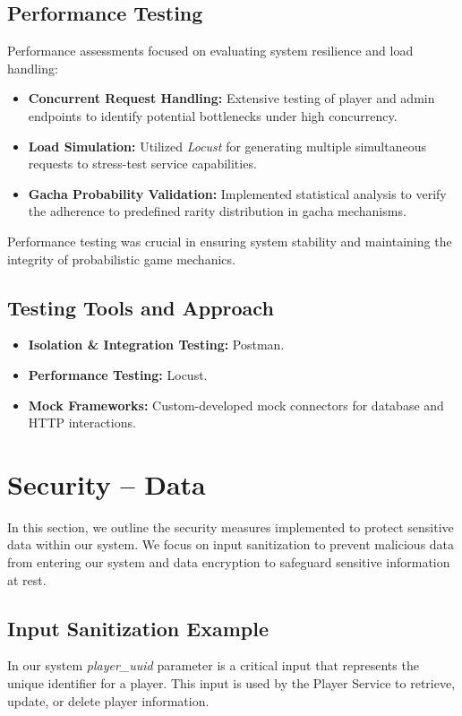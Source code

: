 \documentclass{article}
\begin{document}
\subsection{Performance Testing}
Performance assessments focused on evaluating system resilience and load handling:
\begin{itemize}
    \item \textbf{Concurrent Request Handling:} Extensive testing of player and admin endpoints to identify potential bottlenecks under high concurrency.
    \item \textbf{Load Simulation:} Utilized \emph{Locust} for generating multiple simultaneous requests to stress-test service capabilities.
    \item \textbf{Gacha Probability Validation:} Implemented statistical analysis to verify the adherence to predefined rarity distribution in gacha mechanisms.
\end{itemize}
Performance testing was crucial in ensuring system stability and maintaining the integrity of probabilistic game mechanics.

\subsection{Testing Tools and Approach}
\begin{itemize}
    \item \textbf{Isolation \& Integration Testing:} Postman.
    \item \textbf{Performance Testing:} Locust.
    \item \textbf{Mock Frameworks:} Custom-developed mock connectors for database and HTTP interactions.
\end{itemize}
\newpage

\section{Security – Data}
In this section, we outline the security measures implemented to protect sensitive data within our system. We focus on input sanitization to prevent malicious data from entering our system and data encryption to safeguard sensitive information at rest.

\subsection{Input Sanitization Example}
In our system \emph{player\_uuid} parameter is a critical input that represents the unique identifier for a player. This input is used by the Player Service to retrieve, update, or delete player information.
\end{document}
